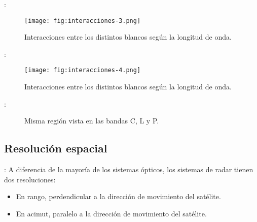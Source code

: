 \begin{frame}{\secname : \subsecname}
    \begin{figure}
      \centering
      \texttt{[image: fig:interacciones-3.png]}
      \caption{Interacciones entre los distintos blancos según la longitud de onda.}
      \label{}
    \end{figure}
\end{frame}

\begin{frame}{\secname : \subsecname}
    \begin{figure}
      \centering
      \texttt{[image: fig:interacciones-4.png]}
      \caption{Interacciones entre los distintos blancos según la longitud de onda.}
      \label{}
    \end{figure}
\end{frame}


\begin{frame}{\secname : \subsecname}
    \begin{figure}
    \centering
    \hspace{1cm}
    \hspace{1cm}
    \caption{Misma región vista en las bandas C, L y P.}
    \end{figure}
\end{frame}
\subsection{Resolución espacial}

\begin{frame}{\secname : \subsecname}
    A diferencia de la mayoría de los sistemas ópticos, los sistemas de radar tienen dos resoluciones:
    \begin{itemize}
      \item En rango, perdendicular a la dirección de movimiento del satélite.
      \item En acimut, paralelo a la dirección de movimiento del satélite.
    \end{itemize}
\end{frame}

